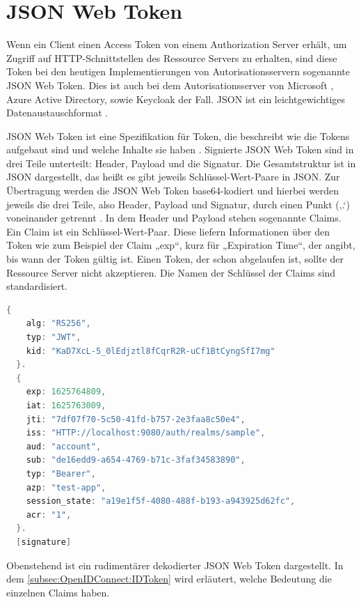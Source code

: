 \section{JSON Web Token}
\label{sec:JSONWebToken}
Wenn ein Client einen Access Token von einem Authorization Server erhält, um Zugriff auf \ac{HTTP}-Schnittstellen des Ressource Servers zu erhalten, sind diese Token bei den heutigen Implementierungen von Autorisationsservern sogenannte \ac{JSON} Web Token. Dies ist auch bei dem Autorisationsserver von Microsoft \citep{azuread:2021}, Azure Active Directory, sowie Keycloak \citep{keycloak:2021} der Fall. \ac{JSON} ist ein leichtgewichtiges Datenaustauschformat \citep{json:2006}.\smallskip

JSON Web Token ist eine Spezifikation für Token, die beschreibt wie die Tokens aufgebaut sind und welche Inhalte sie haben \citep{jwt:2015}.
Signierte JSON Web Token sind in drei Teile unterteilt: Header, Payload und die Signatur. Die Gesamtstruktur ist in JSON dargestellt, das heißt es gibt jeweils Schlüssel-Wert-Paare in JSON. Zur Übertragung werden die JSON Web Token base64-kodiert und hierbei werden jeweils die drei Teile, also Header, Payload und Signatur, durch einen Punkt (‚.‘) voneinander getrennt \citep{jwt:2015}. 
In dem Header und Payload stehen sogenannte Claims. Ein Claim ist ein Schlüssel-Wert-Paar. Diese liefern Informationen über den Token wie zum Beispiel der Claim „exp“, kurz für „Expiration Time“, der angibt, bis wann der Token gültig ist. Einen Token, der schon abgelaufen ist, sollte der Ressource Server nicht akzeptieren. Die Namen der Schlüssel der Claims sind standardisiert. 

\begin{lstlisting}[language=C++,frame=tb,caption={Beispiel JSON Web Token},label=lst:BeispielJSONWebToken]
  {
    alg: "RS256",
    typ: "JWT",
    kid: "KaD7XcL-5_0lEdjztl8fCqrR2R-uCf1BtCyngSfI7mg"
  }.
  {
    exp: 1625764809,
    iat: 1625763009,
    jti: "7df07f70-5c50-41fd-b757-2e3faa8c50e4",
    iss: "HTTP://localhost:9080/auth/realms/sample",
    aud: "account",
    sub: "de16edd9-a654-4769-b71c-3faf34583890",
    typ: "Bearer",
    azp: "test-app",
    session_state: "a19e1f5f-4080-488f-b193-a943925d62fc",
    acr: "1",
  }.
  [signature]   
\end{lstlisting}
\bigskip

Obenstehend ist ein rudimentärer dekodierter JSON Web Token dargestellt. In dem \autoref{subsec:OpenIDConnect:IDToken}
wird erläutert, welche Bedeutung die einzelnen Claims haben.

